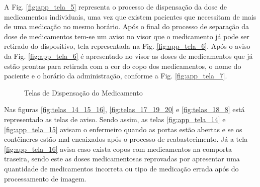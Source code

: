 \begin{apendicesenv}
A Fig. \ref{fig:app_tela_5} representa o processo de dispensação da dose de medicamentos individuais, uma vez que existem pacientes que necessitam de mais de uma medicação no mesmo horário. Após o final do processo de separação da dose de medicamentos tem-se um aviso no visor que o medicamento já pode ser retirado do dispositivo, tela representada na Fig. \ref{fig:app_tela_6}. Após o aviso da Fig. \ref{fig:app_tela_6} é apresentado no visor as doses de medicamentos que já estão prontas para retirada com a cor do copo dos medicamentos, o nome do paciente e o horário da administração, conforme a Fig. \ref{fig:app_tela_7}.

\begin{figure}[H]
    \centering
    \caption{Telas de Dispensação do Medicamento}\label{fig:telas_5_6_7}
\end{figure}

Nas figuras \ref{fig:telas_14_15_16}, \ref{fig:telas_17_19_20} e \ref{fig:telas_18_8} está representado as telas de aviso. Sendo assim, as telas \ref{fig:app_tela_14} e \ref{fig:app_tela_15} avisam o enfermeiro quando as portas estão abertas e se os contêineres estão mal encaixados após o processo de reabastecimento. Já a tela \ref{fig:app_tela_16} avisa caso exista copos com medicamentos na comporta traseira, sendo este as doses medicamentosas reprovadas por apresentar uma quantidade de medicamentos incorreta ou tipo de medicação errada após do processamento de imagem. 



\end{apendicesenv}
